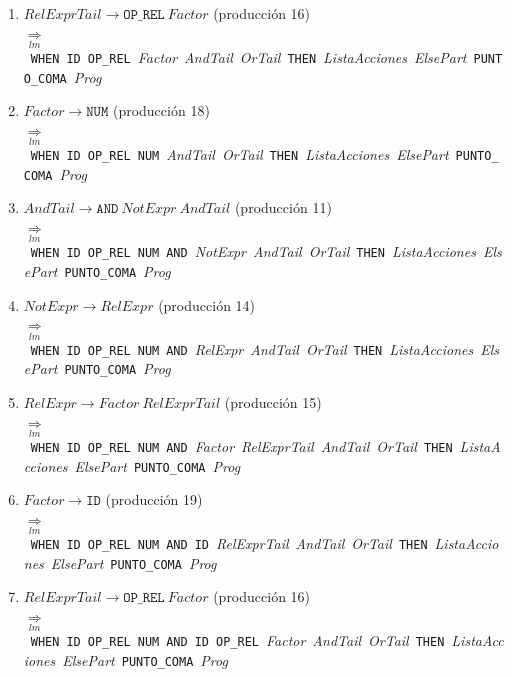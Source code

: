 \documentclass[12pt,a4paper]{article}
\begin{document}
{\begin{enumerate}[leftmargin=1.2cm, itemsep=3pt]
\item $\mathit{RelExprTail} \to \mathtt{OP\_REL}\ \mathit{Factor}$ (producción 16)\\
$\underset{lm}{\Rightarrow}$\ \texttt{WHEN}\ \texttt{ID}\ \texttt{OP\_REL}\ \textit{Factor}\ \textit{AndTail}\ \textit{OrTail}\ \texttt{THEN}\ \textit{ListaAcciones}\ \textit{ElsePart}\ \texttt{PUNTO\_COMA}\ \textit{Prog}
\item $\mathit{Factor} \to \mathtt{NUM}$ (producción 18)\\
$\underset{lm}{\Rightarrow}$\ \texttt{WHEN}\ \texttt{ID}\ \texttt{OP\_REL}\ \texttt{NUM}\ \textit{AndTail}\ \textit{OrTail}\ \texttt{THEN}\ \textit{ListaAcciones}\ \textit{ElsePart}\ \texttt{PUNTO\_COMA}\ \textit{Prog}
\item $\mathit{AndTail} \to \mathtt{AND}\ \mathit{NotExpr}\ \mathit{AndTail}$ (producción 11)\\
$\underset{lm}{\Rightarrow}$\ \texttt{WHEN}\ \texttt{ID}\ \texttt{OP\_REL}\ \texttt{NUM}\ \texttt{AND}\ \textit{NotExpr}\ \textit{AndTail}\ \textit{OrTail}\ \texttt{THEN}\ \textit{ListaAcciones}\ \textit{ElsePart}\ \texttt{PUNTO\_COMA}\ \textit{Prog}
\item $\mathit{NotExpr} \to \mathit{RelExpr}$ (producción 14)\\
$\underset{lm}{\Rightarrow}$\ \texttt{WHEN}\ \texttt{ID}\ \texttt{OP\_REL}\ \texttt{NUM}\ \texttt{AND}\ \textit{RelExpr}\ \textit{AndTail}\ \textit{OrTail}\ \texttt{THEN}\ \textit{ListaAcciones}\ \textit{ElsePart}\ \texttt{PUNTO\_COMA}\ \textit{Prog}
\item $\mathit{RelExpr} \to \mathit{Factor}\ \mathit{RelExprTail}$ (producción 15)\\
$\underset{lm}{\Rightarrow}$\ \texttt{WHEN}\ \texttt{ID}\ \texttt{OP\_REL}\ \texttt{NUM}\ \texttt{AND}\ \textit{Factor}\ \textit{RelExprTail}\ \textit{AndTail}\ \textit{OrTail}\ \texttt{THEN}\ \textit{ListaAcciones}\ \textit{ElsePart}\ \texttt{PUNTO\_COMA}\ \textit{Prog}
\item $\mathit{Factor} \to \mathtt{ID}$ (producción 19)\\
$\underset{lm}{\Rightarrow}$\ \texttt{WHEN}\ \texttt{ID}\ \texttt{OP\_REL}\ \texttt{NUM}\ \texttt{AND}\ \texttt{ID}\ \textit{RelExprTail}\ \textit{AndTail}\ \textit{OrTail}\ \texttt{THEN}\ \textit{ListaAcciones}\ \textit{ElsePart}\ \texttt{PUNTO\_COMA}\ \textit{Prog}
\item $\mathit{RelExprTail} \to \mathtt{OP\_REL}\ \mathit{Factor}$ (producción 16)\\
$\underset{lm}{\Rightarrow}$\ \texttt{WHEN}\ \texttt{ID}\ \texttt{OP\_REL}\ \texttt{NUM}\ \texttt{AND}\ \texttt{ID}\ \texttt{OP\_REL}\ \textit{Factor}\ \textit{AndTail}\ \textit{OrTail}\ \texttt{THEN}\ \textit{ListaAcciones}\ \textit{ElsePart}\ \texttt{PUNTO\_COMA}\ \textit{Prog}

\end{enumerate}}
\end{document}
